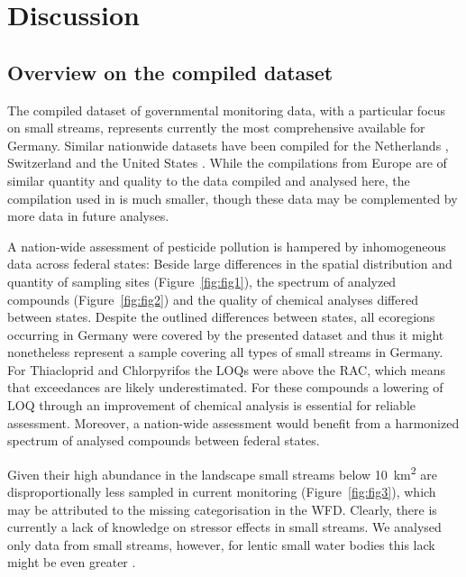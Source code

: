 \documentclass[journal=esthag,manuscript=article]{achemso}
\begin{document}
\section{Discussion}
\subsection{Overview on the compiled dataset}
The compiled dataset of governmental monitoring data, with a particular focus on small streams, represents currently the most comprehensive available for Germany.
Similar nationwide datasets have been compiled for the Netherlands \citep{vijver_spatial_2008}, Switzerland \citep{munz_pestizidmessungen_2011} and the United States \citep{stone2014pesticides}.
While the compilations from Europe are of similar quantity and quality to the  data compiled and analysed here, the compilation used in \citet{stone2014pesticides} is much smaller, though these data may be complemented by more data in future analyses. 

A nation-wide assessment of pesticide pollution is hampered by inhomogeneous data across federal states:
Beside large differences in the spatial distribution and quantity of sampling sites (Figure~\ref{fig:fig1}), the spectrum of analyzed compounds (Figure~\ref{fig:fig2}) and the quality of chemical analyses differed between states. 
Despite the outlined differences between states, all ecoregions occurring in Germany \citep{illies1978limnofauna,abell2008freshwater} were covered by the presented dataset and thus it might nonetheless represent a sample covering all types of small streams in Germany. 
For Thiacloprid and Chlorpyrifos the LOQs were above the RAC, which means that exceedances are likely underestimated.
For these compounds a lowering of LOQ through an improvement of chemical analysis is essential for reliable assessment.
Moreover, a nation-wide assessment would benefit from a harmonized spectrum of analysed compounds between federal states. 

Given their high abundance in the landscape \citep{nadeau_hydrological_2007} small streams below 10~km\textsuperscript{2} are disproportionally less sampled in current monitoring (Figure~\ref{fig:fig3}), which may be attributed to the missing categorisation in the WFD. 
Clearly, there is currently a lack of knowledge on stressor effects in small streams.
We analysed only data from small streams, however, for lentic small water bodies this lack might be even greater \citep{lorenz_specifics_2016}. 
\end{document}
